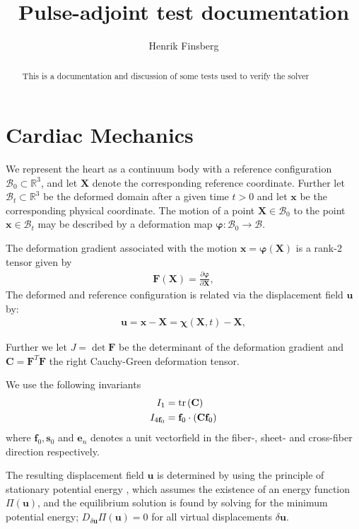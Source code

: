 \documentclass[a4paper,10pt]{article}
\title{Pulse-adjoint test documentation}
\author{Henrik Finsberg}
\newcommand{\tr}{\mathrm{tr} \hspace{0.05cm} }
\newcommand{\Xvec}{\mathbf{X}}
\newcommand{\xvec}{\mathbf{x}}
\newcommand{\uvec}{\mathbf{u}}
\newcommand{\ef}{\mathbf{f}_0}
\newcommand{\es}{\mathbf{s}_0}
\newcommand{\en}{\mathbf{e}_n}
\newcommand{\C}{\mathbf{C}}
\newcommand{\F}{\mathbf{F}}
\begin{document}
\maketitle

\begin{abstract}
This is a documentation and discussion of some tests used to verify the solver
\end{abstract}

\section{Cardiac Mechanics}
We represent the heart as a continuum body with a reference configuration 
$\mathcal{B}_0 \subset \mathbb{R}^3$, and let $\Xvec$ denote the corresponding reference coordinate.
Further let $ \mathcal{B}_t  \subset \mathbb{R}^3$ be the deformed domain after a given time
$t > 0$ and let $\bm{x}$ be the corresponding physical coordinate. 
The motion of a point $\bm{X} \in  \mathcal{B}_0$ to the 
point $\xvec \in  \mathcal{B}_t$ may be described by a deformation map 
$\bm{\varphi} :  \mathcal{B}_0  \rightarrow \mathcal{B}$.

The deformation gradient associated with the motion $\xvec = \bm{\varphi}(\Xvec)$ is a rank-2 tensor given by 
\begin{align}
\F(\Xvec) = \frac{\partial \bm{\varphi}}{\partial \Xvec}, 
\end{align}
The deformed and reference configuration is related via the displacement field  $\uvec$ by:
\begin{align}  
\uvec = \xvec-\Xvec = \bm{\chi}( \Xvec, t) -\Xvec,
\end{align} 


Further we let  $J = \det \F$ be the  determinant of the deformation gradient 
and $\C = \F^T\F$ the right Cauchy-Green deformation tensor.

We use the following invariants
\begin{align}
I_1 &= \tr(\C)\\
I_{4\ef} &= \ef \cdot (\C \ef)
\end{align}
where $\ef, \es$ and $\en$ denotes a unit vectorfield in the fiber-, sheet- and cross-fiber direction respectively. 



The resulting displacement field $\uvec$ is determined by using the principle 
of stationary potential energy \cite{holzapfel2000nonlinear}, which assumes the 
existence of an energy function $\Pi(\uvec)$, and the equilibrium solution is found 
by solving for the minimum potential energy; $D_{\delta \uvec}\Pi(\uvec) = 0$ for all
virtual displacements $\delta \uvec$. 
\end{document}
